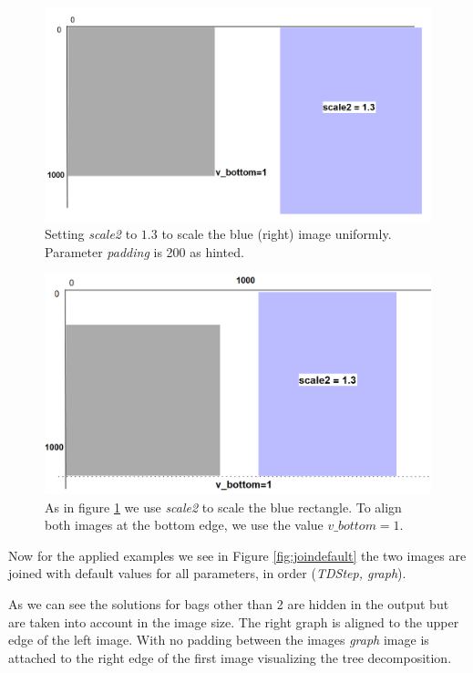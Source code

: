 \documentclass[a4paper, 12pt, bibliography=totoc]{scrartcl}
\begin{document}
\begin{figure}[H]
	\centering
	\includegraphics[width=0.8\linewidth]{images/svgjoinscalednn.png}
	\caption[Joining with scaling of $1.3$]{Setting \textit{scale2} to $1.3$ to scale the blue (right) image uniformly. Parameter \textit{padding} is 200 as hinted.}
	\label{fig:svgjoinscaled}
\end{figure}

\begin{figure}[H]
	\centering
	\includegraphics[width=0.8\linewidth]{images/svgjoinscaledbottomnn.png}
	\caption[Joining a scaled image aligned at the bottom edge]{As in figure \ref{fig:svgjoinscaled} we use \textit{scale2} to scale the blue rectangle. To align both images at the bottom edge, we use the value $v\_bottom=1$.}
	\label{fig:svgjoinscaledbottom}
\end{figure}

Now for the applied examples we see in Figure \ref{fig:joindefault} the two images are joined with default values for all parameters, in order (\textit{TDStep, graph}). 

As we can see the solutions for bags other than 2 are hidden in the output but are taken into account in the image size. The right graph is aligned to the upper edge of the left image. With no padding between the images \textit{graph} image is attached to the right edge of the first image visualizing the {tree decomposition}.
\end{document}
